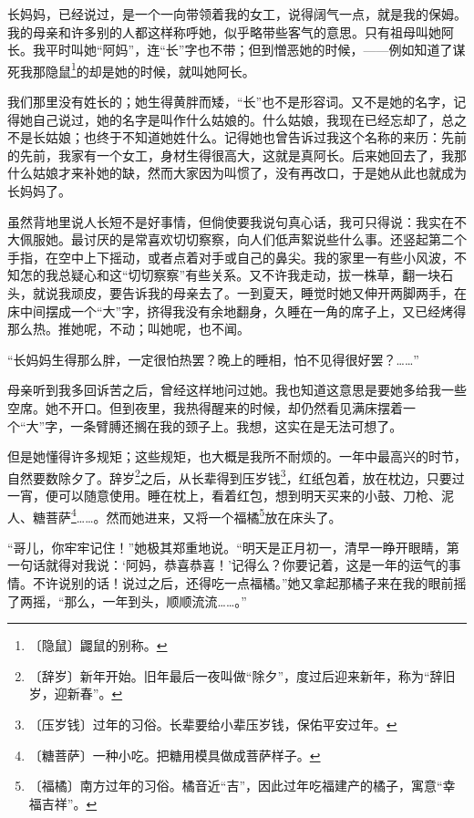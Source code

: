 \documentclass[12pt,UTF-8,openany]{ctexbook}
\begin{document}
\begin{normalsize}
    
    长妈妈，已经说过，是一个一向带领着我的女工，说得阔气一点，就是我的保姆。我的母亲和许多别的人都这样称呼她，似乎略带些客气的意思。只有祖母叫她阿长。我平时叫她“阿妈”，连“长”字也不带；但到憎恶她的时候，——例如知道了谋死我那隐鼠\footnote{〔隐鼠〕鼹鼠的别称。}的却是她的时候，就叫她阿长。
    
    我们那里没有姓长的；她生得黄胖而矮，“长”也不是形容词。又不是她的名字，记得她自己说过，她的名字是叫作什么姑娘的。什么姑娘，我现在已经忘却了，总之不是长姑娘；也终于不知道她姓什么。记得她也曾告诉过我这个名称的来历：先前的先前，我家有一个女工，身材生得很高大，这就是真阿长。后来她回去了，我那什么姑娘才来补她的缺，然而大家因为叫惯了，没有再改口，于是她从此也就成为长妈妈了。
    
    虽然背地里说人长短不是好事情，但倘使要我说句真心话，我可只得说：我实在不大佩服她。最讨厌的是常喜欢切切察察，向人们低声絮说些什么事。还竖起第二个手指，在空中上下摇动，或者点着对手或自己的鼻尖。我的家里一有些小风波，不知怎的我总疑心和这“切切察察”有些关系。又不许我走动，拔一株草，翻一块石头，就说我顽皮，要告诉我的母亲去了。一到夏天，睡觉时她又伸开两脚两手，在床中间摆成一个“大”字，挤得我没有余地翻身，久睡在一角的席子上，又已经烤得那么热。推她呢，不动；叫她呢，也不闻。
    
    “长妈妈生得那么胖，一定很怕热罢？晚上的睡相，怕不见得很好罢？……”
    
    母亲听到我多回诉苦之后，曾经这样地问过她。我也知道这意思是要她多给我一些空席。她不开口。但到夜里，我热得醒来的时候，却仍然看见满床摆着一个“大”字，一条臂膊还搁在我的颈子上。我想，这实在是无法可想了。
    
    但是她懂得许多规矩；这些规矩，也大概是我所不耐烦的。一年中最高兴的时节，自然要数除夕了。辞岁\footnote{〔辞岁〕新年开始。旧年最后一夜叫做“除夕”，度过后迎来新年，称为“辞旧岁，迎新春”。}之后，从长辈得到压岁钱\footnote{〔压岁钱〕过年的习俗。长辈要给小辈压岁钱，保佑平安过年。}，红纸包着，放在枕边，只要过一宵，便可以随意使用。睡在枕上，看着红包，想到明天买来的小鼓、刀枪、泥人、糖菩萨\footnote{〔糖菩萨〕一种小吃。把糖用模具做成菩萨样子。}……。然而她进来，又将一个福橘\footnote{〔福橘〕南方过年的习俗。橘音近“吉”，因此过年吃福建产的橘子，寓意“幸福吉祥”。}放在床头了。
    
    “哥儿，你牢牢记住！”她极其郑重地说。“明天是正月初一，清早一睁开眼睛，第一句话就得对我说：‘阿妈，恭喜恭喜！’记得么？你要记着，这是一年的运气的事情。不许说别的话！说过之后，还得吃一点福橘。”她又拿起那橘子来在我的眼前摇了两摇，“那么，一年到头，顺顺流流……。”
    

\end{normalsize}
\end{document}
